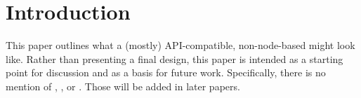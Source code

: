 \documentclass{article}
\begin{document}
\section{Introduction}

\label{sec:intro}

This paper outlines what a (mostly) API-compatible, non-node-based 
might look like.  Rather than presenting a final design, this paper is
intended as a starting point for discussion and as a basis for future work.
Specifically, there is no mention of , , or
.  Those will be added in later papers.



\end{document}
